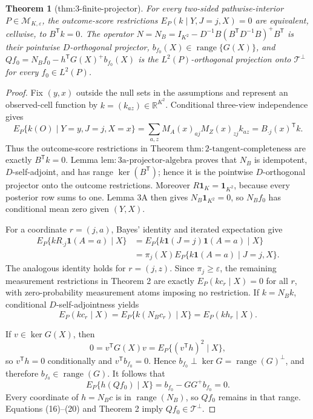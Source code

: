 \documentclass{article}
\newtheorem{theorem}{Theorem}
\begin{document}
\begin{theorem}[thm:3-finite-projector]\label{thm:3-finite-projector}
For every two-sided pathwise-interior \(P\in\mathcal M_{K,\varepsilon}\), the outcome-score restrictions \(E_P(k\mid Y,J=j,X)=0\) are equivalent, cellwise, to \(B^{\mathsf T}k=0\).  The operator \(N=N_B=I_{K^2}-D^{-1}B(B^{\mathsf T}D^{-1}B)^+B^{\mathsf T}\) is their pointwise \(D\)-orthogonal projector, \(b_{f_0}(X)\in\operatorname{range}\{G(X)\}\), and \(Qf_0=N_Bf_0-h^{\mathsf T}G(X)^+b_{f_0}(X)\) is the \(L^2(P)\)-orthogonal projection onto \(\mathcal T^\perp\) for every \(f_0\in L^2(P)\).
\end{theorem}
\begin{proof}
Fix \((y,x)\) outside the null sets in the assumptions and represent an observed-cell function by \(k=(k_{az})\in\mathbb R^{K^2}\).  Conditional three-view independence gives
\[
 E_P\{k(O)\mid Y=y,J=j,X=x\}
 =\sum_{a,z}M_A(x)_{aj}M_Z(x)_{zj}k_{az}
 =B_{\cdot j}(x)^{\mathsf T}k. \tag{16}
\]
Thus the outcome-score restrictions in Theorem \(\mathrm{thm{:}2\mbox{-}tangent\mbox{-}completeness}\) are exactly \(B^{\mathsf T}k=0\).  Lemma \(\mathrm{lem{:}3a\mbox{-}projector\mbox{-}algebra}\) proves that \(N_B\) is idempotent, \(D\)-self-adjoint, and has range \(\ker(B^{\mathsf T})\); hence it is the pointwise \(D\)-orthogonal projector onto the outcome restrictions.  Moreover \(R\mathbf 1_K=\mathbf 1_{K^2}\), because every posterior row sums to one.  Lemma 3A then gives \(N_B\mathbf 1_{K^2}=0\), so \(N_Bf_0\) has conditional mean zero given \((Y,X)\).

For a coordinate \(r=(j,a)\), Bayes' identity and iterated expectation give
\[
\begin{aligned}
 E_P\{kR_{\cdot j}\mathbf 1(A=a)\mid X\}
 &=E_P\{k\mathbf 1(J=j)\mathbf 1(A=a)\mid X\}\\
 &=\pi_j(X)E_P\{k\mathbf 1(A=a)\mid J=j,X\}. \tag{17}
\end{aligned}
\]
The analogous identity holds for \(r=(j,z)\).  Since \(\pi_j\geq\varepsilon\), the remaining measurement restrictions in Theorem 2 are exactly \(E_P(kc_r\mid X)=0\) for all \(r\), with zero-probability measurement atoms imposing no restriction.  If \(k=N_Bk\), conditional \(D\)-self-adjointness yields
\[
 E_P(kc_r\mid X)=E_P\{k(N_Bc_r)\mid X\}=E_P(kh_r\mid X). \tag{18}
\]

If \(v\in\ker G(X)\), then
\[
 0=v^{\mathsf T}G(X)v=E_P\{(v^{\mathsf T}h)^2\mid X\}, \tag{19}
\]
so \(v^{\mathsf T}h=0\) conditionally and \(v^{\mathsf T}b_{f_0}=0\).  Hence
\(b_{f_0}\perp\ker G=\operatorname{range}(G)^\perp\), and therefore \(b_{f_0}\in\operatorname{range}(G)\).  It follows that
\[
 E_P\{h(Qf_0)\mid X\}
 =b_{f_0}-GG^+b_{f_0}=0. \tag{20}
\]
Every coordinate of \(h=N_Bc\) is in \(\operatorname{range}(N_B)\), so \(Qf_0\) remains in that range.  Equations (16)--(20) and Theorem 2 imply \(Qf_0\in\mathcal T^\perp\).


\end{proof}
\end{document}
